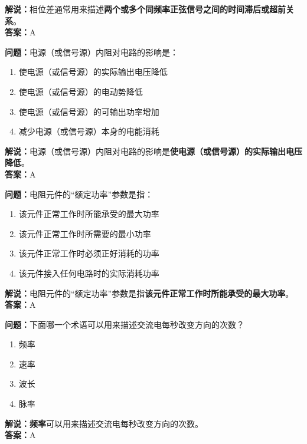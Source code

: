 \textbf{解说：}相位差通常用来描述\textbf{两个或多个同频率正弦信号之间的时间滞后或超前关系}。\\\textbf{答案：}A



\textbf{问题：}电源（或信号源）内阻对电路的影响是：

\begin{enumerate}[label=\Alph*), leftmargin=1.5cm]
	\item 使电源（或信号源）的实际输出电压降低
	\item 使电源（或信号源）的电动势降低
	\item 使电源（或信号源）的可输出功率增加
	\item 减少电源（或信号源）本身的电能消耗
\end{enumerate}

\textbf{解说：}电源（或信号源）内阻对电路的影响是\textbf{使电源（或信号源）的实际输出电压降低}。\\\textbf{答案：}A



\textbf{问题：}电阻元件的“额定功率”参数是指：

\begin{enumerate}[label=\Alph*), leftmargin=1.5cm]
	\item 该元件正常工作时所能承受的最大功率
	\item 该元件正常工作时所需要的最小功率
	\item 该元件正常工作时必须正好消耗的功率
	\item 该元件接入任何电路时的实际消耗功率
\end{enumerate}

\textbf{解说：}电阻元件的“额定功率”参数是指\textbf{该元件正常工作时所能承受的最大功率}。\\\textbf{答案：}A



\textbf{问题：}下面哪一个术语可以用来描述交流电每秒改变方向的次数？

\begin{enumerate}[label=\Alph*), leftmargin=1.5cm]
	\item 频率
	\item 速率
	\item 波长
	\item 脉率
\end{enumerate}

\textbf{解说：}\textbf{频率}可以用来描述交流电每秒改变方向的次数。\\\textbf{答案：}A




